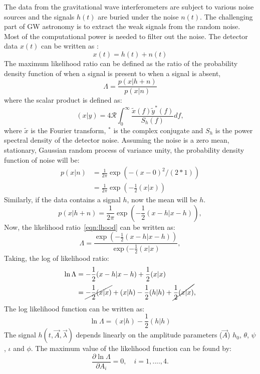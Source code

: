 \documentclass{ttuthes2007}
\begin{document}
The data from the gravitational wave interferometers are subject to various
noise sources and the signals $h(t)$ are buried under the noise $n(t)$. The challenging part
of \ac{GW} astronomy is to extract the weak signals from the random noise.
Most of the computational power is needed to filter out the noise. The
detector data $x(t)$ can be written as :
\begin{equation}
x(t) = h(t)+n(t)
\end{equation}
The maximum likelihood ratio can be defined as the ratio of the probability density function
of when a signal is present to when a signal is absent,
\begin{equation}\label{eqn:lhood}
\Lambda = \frac{p(x|h+n)}{p(x|n)}
\end{equation}
where the scalar product is defined as:
\begin{equation}
(x|y)=4\mathcal{R} \int_{0}^{\infty}\frac{\tilde{x}(f)\tilde{y}^*(f)}{S_h(f)}df, 
\end{equation}
where $\tilde{x}$ is the Fourier transform, $^*$ is the complex conjugate and 
$S_h$ is the power spectral density of the detector noise.
Assuming the noise is a zero mean, stationary, Gaussian random process of
variance unity, the probability density function of noise will be:
\begin{align*}
p(x|n) & = \frac{1}{2\pi}\exp(-(x-0)^2/(2*1))\\
&= \frac{1}{2\pi} \exp(-\frac{1}{2}(x|x))
\end{align*}
Similarly, if the data contains a signal $h$, now the mean will be $h$.
\begin{equation}
p(x|h+n)=\frac{1}{2\pi} \exp(-\frac{1}{2}(x-h|x-h)),
\end{equation}
Now, the likelihood ratio~\ref{eqn:lhood} can be written as:
\begin{equation}
\Lambda= \frac{\exp(-\frac{1}{2}(x-h|x-h))}{\exp(-\frac{1}{2}(x|x)},
\end{equation}
Taking, the log of likelihood ratio:
\begin{align*}
\ln{\Lambda} & =-\frac{1}{2}(x-h|x-h) + \frac{1}{2}(x|x)\\
& = \cancel{-\frac{1}{2}(x|x)}
+(x|h)-\frac{1}{2}(h|h)+\cancel{\frac{1}{2}(x|x)},
\end{align*}
The log likelihood function can be written as:
\begin{equation}
\ln{\Lambda}=(x|h)-\frac{1}{2}(h|h)
\end{equation}
The signal $h(t,\vec{A},\vec{\lambda})$ depends linearly on the amplitude
parameters ($\vec{A}$) $h_0$, $\theta$, $\psi$, $\iota$ and $\phi$. The maximum
value of the likelihood function can be found by:
\begin{equation}
\frac{\partial\ln\Lambda}{\partial A_i}= 0, \quad i=1,....,4.  
\end{equation}
\end{document}
